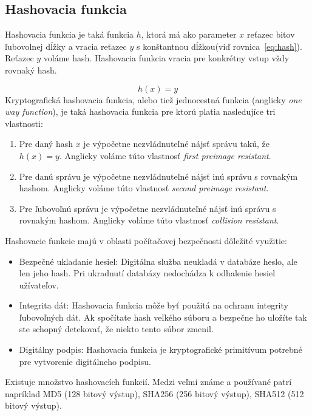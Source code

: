 \subsection{Hashovacia funkcia}\label{subsec:hash}
Hashovacia funkcia je taká funkcia $h$, ktorá má ako parameter $x$ reťazec bitov ľubovolnej dĺžky a vracia reťazec $y$ s konštantnou dĺžkou(viď rovnica~\ref{eq:hash}). Reťazec $y$ voláme hash. Hashovacia funkcia vracia pre konkrétny vstup vždy rovnaký hash.

\begin{equation} \label{eq:hash}
	h(x) = y
\end{equation}
Kryptografická hashovacia funkcia, alebo tiež jednocestná funkcia (anglicky \textit{one way function}), je taká hashovacia funkcia pre ktorú platia nasledujíce tri vlastnosti:
\begin{enumerate}
	\item Pre daný hash $x$ je výpočetne nezvládnuteľné nájsť správu takú, že $ h(x) = y $. Anglicky voláme túto vlastnosť \textit{first preimage resistant}.
	\item Pre danú správu je výpočetne nezvládnuteľné nájsť inú správu s rovnakým hashom. Anglicky voláme túto vlastnosť \textit{second preimage resistant}.
	\item Pre ľubovoľnú správu je výpočetne nezvládnuteľné nájsť inú správu s rovnakým hashom. Anglicky voláme túto vlastnosť \textit{collision resistant}.
\end{enumerate}

Hashovacie funkcie majú v oblasti počítačovej bezpečnosti dôležité využitie:
\begin{itemize}
	\item Bezpečné ukladanie hesiel: Digitálna služba neukladá v databáze heslo, ale len jeho hash. Pri ukradnutí databázy nedochádza k odhalenie hesiel užívateľov.
	\item Integrita dát: Hashovacia funkcia môže byť použitá na ochranu integrity ľubovoľných dát. Ak spočítate hash veľkého súboru a bezpečne ho uložíte tak ste schopný detekovať, že niekto tento súbor zmenil.
	\item Digitálny podpis: Hashovacia funkcia je kryptografické primitívum potrebné pre vytvorenie digitálneho podpisu.
\end{itemize}
Existuje množstvo hashovacích funkcií. Medzi veľmi známe a používané patrí napríklad MD5 (128 bitový výstup), SHA256 (256 bitový výstup), SHA512 (512 bitový výstup).~\cite{cryptoHandbook, nigelSmartCrypto}

